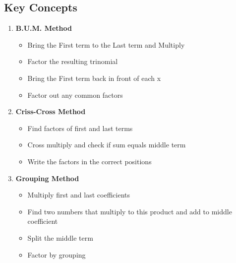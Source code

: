 \documentclass[12pt]{article}
\begin{document}
\subsection*{Key Concepts}
\begin{tcolorbox}[colback=lightgray,colframe=primary,title=Methods of Factoring]
    \begin{enumerate}
        \item \textbf{B.U.M. Method}
        \begin{itemize}
            \item Bring the First term to the Last term and Multiply
            \item Factor the resulting trinomial
            \item Bring the First term back in front of each x
            \item Factor out any common factors
        \end{itemize}
        
        \item \textbf{Criss-Cross Method}
        \begin{itemize}
            \item Find factors of first and last terms
            \item Cross multiply and check if sum equals middle term
            \item Write the factors in the correct positions
        \end{itemize}
        
        \item \textbf{Grouping Method}
        \begin{itemize}
            \item Multiply first and last coefficients
            \item Find two numbers that multiply to this product and add to middle coefficient
            \item Split the middle term
            \item Factor by grouping
        \end{itemize}
    \end{enumerate}
\end{tcolorbox}
\end{document}
